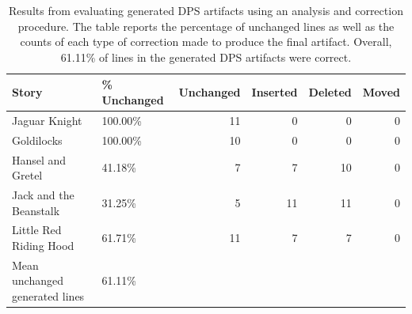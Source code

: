 \documentclass[phd,electronic,oneside,twosidetoc,letterpaper,chaptercenter,parttop,lof]{byumsphd}
\begin{document}
\begin{table}[t]
\centering
\begin{tabular}{llrrrr}
\toprule
                 Story & \% Unchanged &  Unchanged &  Inserted &  Deleted &  Moved \\
\midrule
         Jaguar Knight &           100.00\% &             11 &             0 &            0 &          0 \\
            Goldilocks &           100.00\% &             10 &             0 &            0 &          0 \\
     Hansel and Gretel &            41.18\% &              7 &             7 &           10 &          0 \\
Jack and the Beanstalk &            31.25\% &              5 &            11 &           11 &          0 \\
Little Red Riding Hood &            61.71\% &             11 &             7 &            7 &          0 \\
\midrule
                    Mean unchanged generated lines &            61.11\% &               &              &             &           \\
\bottomrule
\end{tabular}
\caption{Results from evaluating generated DPS artifacts using an analysis and correction procedure. The table reports the percentage of unchanged lines as well as the counts of each type of correction made to produce the final artifact. Overall, 61.11\% of lines in the generated DPS artifacts were correct.}
\label{tab:dps}
\end{table}
\end{document}
